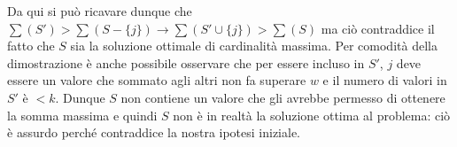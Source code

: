 \documentclass[../cheatSheetAlgoritmi.tex]{subfiles}
\begin{document}
Da qui si può ricavare dunque che $\sum(S') > \sum(S - \{j\}) \rightarrow \sum(S' \cup \{j\}) > \sum(S)$ ma ciò contraddice il fatto che $S$ sia la soluzione ottimale di cardinalità massima. Per comodità della dimostrazione è anche possibile osservare che per essere incluso in $S'$, $j$ deve essere un valore che sommato agli altri non fa superare $w$ e il numero di valori in $S'$ è $< k$. Dunque $S$ non contiene un valore che gli avrebbe permesso di ottenere la somma massima e quindi $S$ non è in realtà la soluzione ottima al problema: ciò è assurdo perché contraddice la nostra ipotesi iniziale.
 
\end{document}
